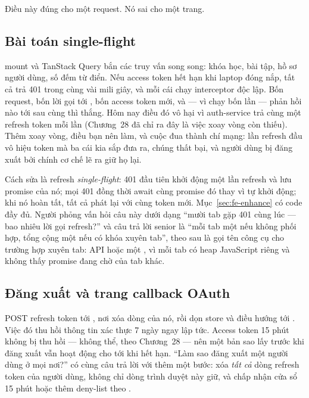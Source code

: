 Điều này đúng cho một request. Nó sai cho một trang.

\subsection{Bài toán single-flight}

 mount và TanStack Query bắn các truy vấn song
song: khóa học, bài tập, hồ sơ người dùng, số đếm từ điển. Nếu access
token hết hạn khi laptop đóng nắp, tất cả trả 401 trong cùng vài mili
giây, và mỗi cái chạy interceptor độc lập. Bốn request, bốn lời gọi tới
, bốn access token mới, và --- vì
 chạy bốn lần --- phản hồi nào tới sau cùng thì thắng.
Hôm nay điều đó vô hại vì auth-service trả cùng một refresh token mỗi
lần (Chương~28 đã chỉ ra đây là việc xoay vòng còn thiếu). Thêm xoay
vòng, điều bạn nên làm, và cuộc đua thành chí mạng: lần refresh đầu vô
hiệu token mà ba cái kia sắp đưa ra, chúng thất bại, và người dùng bị
đăng xuất bởi chính cơ chế lẽ ra giữ họ lại.

Cách sửa là refresh \emph{single-flight}: 401 đầu tiên khởi động một
lần refresh và lưu promise của nó; mọi 401 đồng thời await cùng
promise đó thay vì tự khởi động; khi nó hoàn tất, tất cả phát lại với
cùng token mới. Mục~\ref{sec:fe-enhance} có code đầy đủ. Người phỏng
vấn hỏi câu này dưới dạng ``mười tab gặp 401 cùng lúc --- bao nhiêu lời
gọi refresh?'' và câu trả lời senior là ``mỗi tab một nếu không phối
hợp, tổng cộng một nếu có khóa xuyên tab'', theo sau là gọi tên công cụ
cho trường hợp xuyên tab:  API hoặc một
, vì mỗi tab có heap JavaScript riêng và không
thấy promise đang chờ của tab khác.

\subsection{Đăng xuất và trang callback OAuth}

 POST refresh token tới
, nơi xóa dòng của nó, rồi dọn store và điều
hướng tới . Việc đó thu hồi thông tin xác thực 7 ngày ngay
lập tức. Access token 15 phút không bị thu hồi --- không thể, theo
Chương~28 --- nên một bản sao lấy trước khi đăng xuất vẫn hoạt động cho
tới khi hết hạn. ``Làm sao đăng xuất một người dùng ở mọi nơi?'' có
cùng câu trả lời với thêm một bước: xóa \emph{tất cả} dòng refresh
token của người dùng, không chỉ dòng trình duyệt này giữ, và chấp nhận
cửa sổ 15 phút hoặc thêm deny-list theo .

